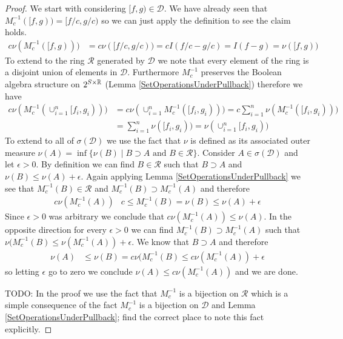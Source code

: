 \documentclass{amsart}
\theoremstyle{remark}
\theoremstyle{definition}
\begin{document}
\begin{proof}
We start with considering $[f,g) \in \mathcal{D}$.  We have already
seen that $M_c^{-1}([f,g)) = [f/c, g/c)$ so we can just apply the
definition to see the claim holds.
\begin{align*}
c \nu(M_c^{-1}([f,g))) &= c \nu([f/c,g/c)) = c I(f/c-g/c) = I(f-g) =
\nu([f,g))
\end{align*}
To extend to the ring $\mathcal{R}$ generated by $\mathcal{D}$ we note that every
element of the ring is a disjoint union of elements in $\mathcal{D}$.
Furthermore $M_c^{-1}$ preserves the Boolean algebra structure on
$2^{S \times \mathbb{R}}$ (Lemma \ref{SetOperationsUnderPullback})
therefore 
we have
\begin{align*}
c \nu(M_c^{-1}(\cup_{i=1}^n [f_i, g_i))) &= c \nu(\cup_{i=1}^n
M_c^{-1}([f_i, g_i))) = c \sum_{i=1}^n \nu(M_c^{-1}([f_i,g_i))) \\
&= \sum_{i=1}^n \nu([f_i,g_i)) = \nu(\cup_{i=1}^n [f_i, g_i))
\end{align*}
To extend to all of $\sigma(\mathcal{D})$ we use the fact that $\nu$
is defined as its associated outer measure $\nu(A) = \inf \lbrace
\nu(B) \mid B \supset A \text{ and } B \in \mathcal{R}\rbrace$.
Consider $A \in \sigma(\mathcal{D})$ and let $\epsilon > 0$.  By
definition we can find $B \in \mathcal{R}$ such that $B \supset A$ and
$\nu(B) \leq \nu(A) + \epsilon$.  Again applying Lemma
\ref{SetOperationsUnderPullback} we see that $M_c^{-1} (B) \in
\mathcal{R}$ and $M_c^{-1}(B) \supset M_c^{-1}(A)$ and therefore
\begin{align*}
c \nu(M_c^{-1}(A)) & c \leq M_c^{-1}(B) = \nu(B) \leq \nu(A) +\epsilon
\end{align*}
Since $\epsilon>0$ was arbitrary we conclude that $c \nu(M_c^{-1}(A))
\leq \nu(A)$.  In the opposite direction for every $\epsilon > 0$ we
can find $M_c^{-1}(B) \supset M_c^{-1}(A)$ such that $\nu(M_c^{-1}(B)
\leq \nu(M_c^{-1}(A)) + \epsilon$.  We know that $B \supset A$ and
therefore
\begin{align*}
\nu(A) &\leq \nu(B) = c \nu(M_c^{-1}(B) \leq c \nu(M_c^{-1}(A)) + \epsilon
\end{align*}
so letting $\epsilon$ go to zero we conclude $\nu(A) \leq c
\nu(M_c^{-1}(A))$ and we are done.

TODO: In the proof we use the fact that $M_c^{-1}$ is a bijection on
$\mathcal{R}$ which is a simple consequence of the fact $M_c^{-1}$ is
a bijection on $\mathcal{D}$ and Lemma \ref{SetOperationsUnderPullback};
find the correct place to note this fact explicitly.
\end{proof}
\end{document}
